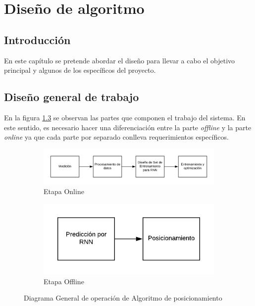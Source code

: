 \chapter{Diseño de algoritmo}
\section{Introducción}
En este capítulo se pretende abordar el diseño para llevar a cabo el objetivo principal y algunos de los específicos del proyecto.

\section{Diseño general de trabajo}
En la figura \ref{fig:esquema} se observan las partes que componen el trabajo del sistema. En este sentido, es necesario hacer una diferenciación entre la parte \textit{offline} y la parte \textit{online} ya que cada parte por separado conlleva requerimientos específicos.

\begin{figure}[h!]
    \centering
    \begin{subfigure}[b]{0.7\textwidth}
        \includegraphics[width=\textwidth]{./images/online}
        \caption{Etapa Online}
        \label{fig:Online}
    \end{subfigure}
    
    \begin{subfigure}[b]{0.4\textwidth}
        \includegraphics[width=\textwidth]{./images/offline}
        \caption{Etapa Offline}
        \label{fig:offline}
    \end{subfigure}
    \caption{Diagrama General de operación de Algoritmo de posicionamiento}
    \label{fig:esquema}
\end{figure}

